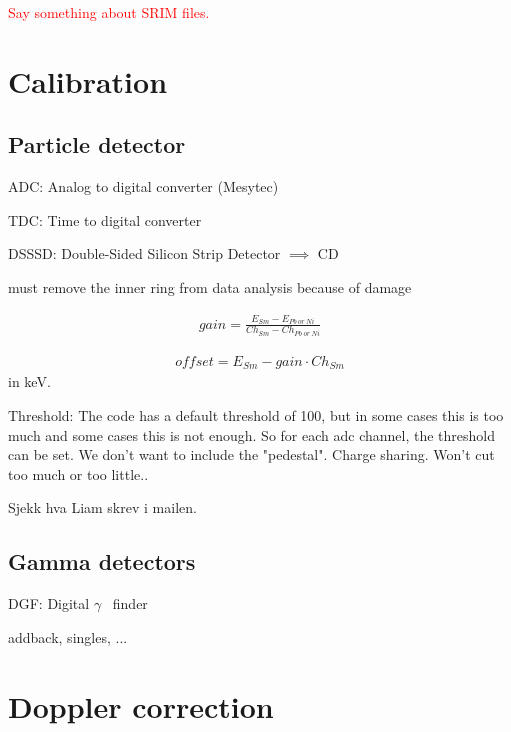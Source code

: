 \documentclass[twoside,english]{uiofysmaster/uiofysmaster}
\newcommand{\ga}{$\gamma$}
\begin{document}
\bigskip

\textcolor{red}{Say something about SRIM files.}

\bigskip



\section{Calibration}
\subsection{Particle detector}
ADC: Analog to digital converter (Mesytec)

TDC: Time to digital converter

DSSSD: Double-Sided Silicon Strip Detector $\implies$ CD

must remove the inner ring from data analysis because of damage

\begin{align*}
	gain = \frac{E_{Sm} - E_{Pb ~or~ Ni}}{Ch_{Sm} - Ch_{Pb ~or~ Ni}}
\end{align*}

\begin{align*}
	offset = E_{Sm} - gain \cdot Ch_{Sm}
\end{align*}
in keV.


Threshold: The code has a default threshold of 100, but in some cases this is too much and some cases this is not enough. So for each adc channel, the threshold can be set. We don't want to include the "pedestal". Charge sharing.
Won't cut too much or too little..

Sjekk hva Liam skrev i mailen. 


\subsection{Gamma detectors}

DGF: Digital \ga~ finder

addback, singles, ...


\section{Doppler correction}

\end{document}
